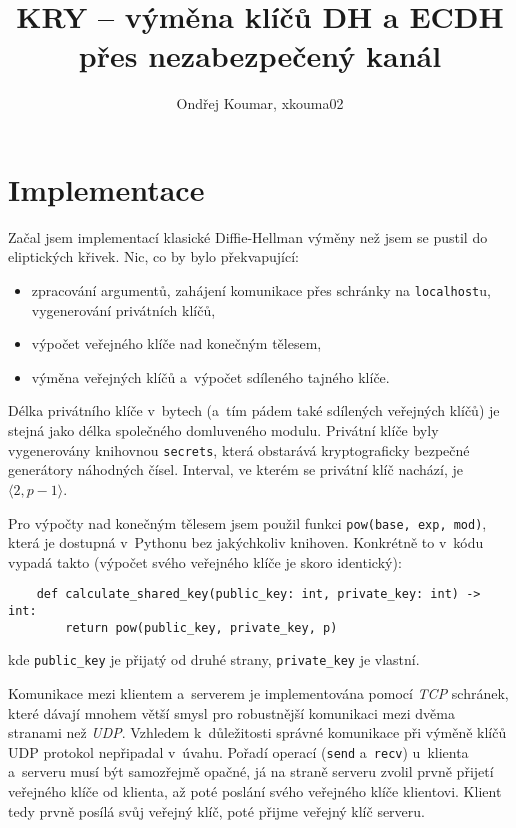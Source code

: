 \documentclass[11pt, a4paper]{article}
\author{Ondřej Koumar, xkouma02}
\date{}
\title{KRY -- výměna klíčů DH a ECDH přes nezabezpečený kanál}
\begin{document}
\maketitle

\section{Implementace}\label{kap:implementace}

Začal jsem implementací klasické Diffie-Hellman výměny než jsem se pustil do eliptických křivek.
Nic, co by bylo překvapující:
\begin{itemize}
    \item zpracování argumentů, zahájení komunikace přes schránky na \texttt{localhost}u, vygenerování privátních klíčů,
    \item výpočet veřejného klíče nad konečným tělesem,
    \item výměna veřejných klíčů a~výpočet sdíleného tajného klíče.
\end{itemize}
Délka privátního klíče v~bytech (a~tím pádem také sdílených veřejných klíčů) je stejná jako délka společného domluveného modulu.
Privátní klíče byly vygenerovány knihovnou \texttt{secrets}, která obstarává kryptograficky bezpečné generátory náhodných čísel.
Interval, ve kterém se privátní klíč nachází, je $\langle 2, p - 1 \rangle$. 

Pro výpočty nad konečným tělesem jsem použil funkci \texttt{pow(base, exp, mod)}, která je dostupná v~Pythonu bez jakýchkoliv knihoven.
Konkrétně to v~kódu vypadá takto (výpočet svého veřejného klíče je skoro identický):
\begin{verbatim}
    def calculate_shared_key(public_key: int, private_key: int) -> int:
        return pow(public_key, private_key, p)
\end{verbatim}
kde \texttt{public\_key} je přijatý od druhé strany, \texttt{private\_key} je vlastní.

Komunikace mezi klientem a~serverem je implementována pomocí \emph{TCP} schránek, které dávají mnohem větší smysl pro robustnější komunikaci mezi dvěma stranami než \emph{UDP}.
Vzhledem k~důležitosti správné komunikace při výměně klíčů UDP protokol nepřipadal v~úvahu.
Pořadí operací (\texttt{send} a~\texttt{recv}) u~klienta a~serveru musí být samozřejmě opačné, já na straně serveru zvolil prvně přijetí veřejného klíče od klienta, až poté poslání svého veřejného klíče klientovi.
Klient tedy prvně posílá svůj veřejný klíč, poté přijme veřejný klíč serveru.
\end{document}
